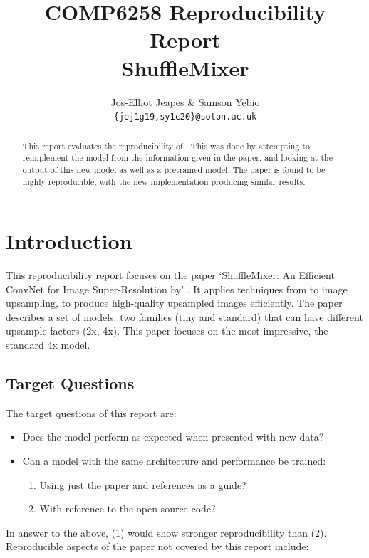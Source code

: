 \documentclass{article}
\title{COMP6258 Reproducibility Report \\ ShuffleMixer}
\author{Jos-Elliot Jeapes \& Samson Yebio \\
\texttt{\{jej1g19,sy1c20\}@soton.ac.uk} \\
}
\begin{document}
    \maketitle

    \begin{abstract}
    This report evaluates the reproducibility of \citet{sun2022shufflemixer}. This was done by attempting to reimplement the model from the information given in the paper, and looking at the output of this new model as well as a pretrained model. The paper is found to be highly reproducible, with the new implementation producing similar results.
    \end{abstract}

    \section{Introduction}

    This reproducibility report focuses on the paper `ShuffleMixer: An Efficient ConvNet for Image
    Super-Resolution by' \citet{sun2022shufflemixer}. It applies techniques from \citet{ma2018shufflenet} to image upsampling, to produce high-quality upsampled images efficiently. The paper describes a set of models: two families (tiny and standard) that can have different upsample factors (2x, 4x). This paper focuses on the most impressive, the standard 4x model.

    \subsection{Target Questions} \label{sec:target questions}

    The target questions of this report are:

    \begin{itemize}
        \item Does the model perform as expected when presented with new data?
        \item Can a model with the same architecture and performance be trained:
        \begin{enumerate}
            \item Using just the paper and references as a guide?
            \item With reference to the open-source code?
        \end{enumerate}
    \end{itemize}

    In answer to the above, (1) would show stronger reproducibility than (2). Reproducible aspects of the paper not covered by this report include:
\end{document}
